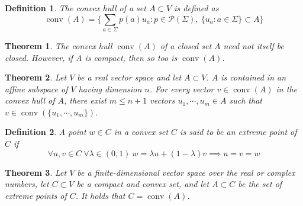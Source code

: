 \documentclass[aps,pra,onecolumn,notitlepage,superscriptaddress]{revtex4-1}
\newcommand{\spc}[1]{\mathcal{#1}}
\newcommand{\op}[1]{\operatorname{#1}}
\newtheorem{theo}{Theorem}
\newtheorem{defi}{Definition}
\begin{document}
    \begin{defi}
       The convex hull of a set $A \subset V$ is defined as
       \begin{equation}
           \op{conv}(A) = \{ \sum_{a \in \Sigma} p(a)u_a: p \in \spc P(\Sigma), \ \{ u_a : a \in \Sigma \} \subset A \}
       \end{equation}
    \end{defi}
    
    \begin{theo}
        The convex hull $\op{conv}(A)$ of a closed set $A$ need not itself be closed. However, if A is compact, then so too is $\op{conv}(A)$.
    \end{theo}

    \begin{theo}
        Let $V$ be a real vector space and let $A \subset V$. $A$ is contained in an affine subspace of $V$ having dimension $n$. For every vector $v \in \op{conv}(A)$ in the convex hull of $A$, there exist $m \leq n + 1$ vectors $u_1 , \cdots , u_m \in A$ such that $v \in \op{conv} \left(\{u_1, \cdots, u_m\} \right)$. 
    \end{theo}
    
    \begin{defi}
        A point $w \in C$ in a convex set $C$ is said to be an extreme point of $C$ if
        \begin{equation}
            \forall u,v \in C \  \forall \lambda \in (0,1) \ w = \lambda u + (1-\lambda) v \implies u=v=w
        \end{equation}
    \end{defi}

    \begin{theo}
        Let $V$ be a finite-dimensional vector space over the real or complex numbers, let $C \subset V$ be a compact and convex set, and let $A \subset C$ be the set of extreme points of $C$. It holds that $C = \op{conv}(A)$.
    \end{theo}
\end{document}
